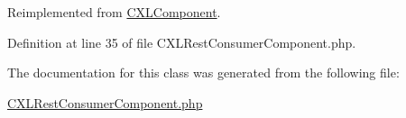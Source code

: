 Reimplemented from \hyperlink{classCXLComponent_aa607ab5e557e6ebb60b85c5a20ad067f}{CXLComponent}.



Definition at line 35 of file CXLRestConsumerComponent.php.



The documentation for this class was generated from the following file:\begin{DoxyCompactItemize}
\item 
\hyperlink{CXLRestConsumerComponent_8php}{CXLRestConsumerComponent.php}\end{DoxyCompactItemize}
